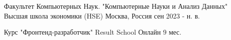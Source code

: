 

\begin{cventries}

  \cventry
    {Факультет Компьютерных Наук. "Компьютерные Науки и Анализ Данных"} %
    {Высшая школа экономики (HSE)} %
    {Москва, Россия} %
    {сен 2023 - н. в.} %

    \cventry
    {Курс "Фронтенд-разработчик"} %
    {Result School} %
    {Онлайн} %
    {9 мес.} %
\end{cventries}
